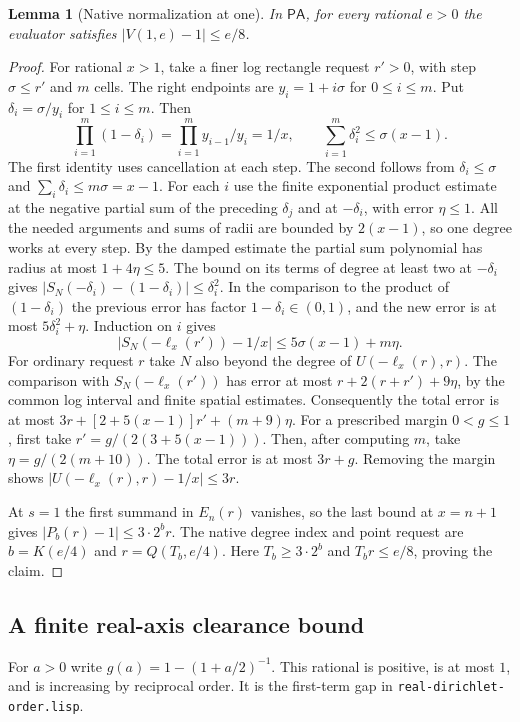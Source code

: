 \documentclass[11pt]{amsart}
\newtheorem{lemma}[theorem]{Lemma}
\theoremstyle{definition}
\theoremstyle{remark}
\numberwithin{equation}{section}
\newcommand{\PA}{\mathsf{PA}}
\newcommand{\code}[1]{\nolinkurl{#1}}
\begin{document}
\begin{lemma}[Native normalization at one]\label{lem:native-at-one}
In $\PA$, for every rational $e>0$ the evaluator satisfies
$|V(1,e)-1|\le e/8$.
\end{lemma}
\begin{proof}
For rational $x>1$, take a finer log rectangle request
$r'>0$, with step $\sigma\le r'$ and $m$ cells. The right
endpoints are $y_i=1+i\sigma$ for $0\le i\le m$.
Put $\delta_i=\sigma/y_i$ for $1\le i\le m$. Then
\[
 \prod_{i=1}^m(1-\delta_i)=\prod_{i=1}^m y_{i-1}/y_i=1/x,
 \qquad
 \sum_{i=1}^m \delta_i^2\le\sigma(x-1).
\]
The first identity uses cancellation at each step. The
second follows from $\delta_i\le\sigma$ and
$\sum_i\delta_i\le m\sigma=x-1$.
For each $i$ use the finite exponential product estimate
at the negative partial sum of the preceding $\delta_j$
and at $-\delta_i$, with error $\eta\le1$. All the needed
arguments and sums of radii are bounded by $2(x-1)$, so
one degree works at every step. By the damped estimate
the partial sum polynomial has radius at most $1+4\eta\le5$.
The bound on its terms of degree at least two at
$-\delta_i$ gives $|S_N(-\delta_i)-(1-\delta_i)|\le\delta_i^2$.
In the comparison to the product of $(1-\delta_i)$ the
previous error has factor $1-\delta_i\in(0,1)$, and the new
error is at most $5\delta_i^2+\eta$. Induction on $i$ gives
\[
 |S_N(-\ell_x(r'))-1/x|\le5\sigma(x-1)+m\eta.
\]
For ordinary request $r$ take $N$ also beyond the degree
of $U(-\ell_x(r),r)$. The comparison with
$S_N(-\ell_x(r'))$ has error at most $r+2(r+r')+9\eta$,
by the common log interval and finite spatial estimates.
Consequently the total error is at most
$3r+[2+5(x-1)]r'+(m+9)\eta$. For a prescribed margin
$0<g\le1$, first take $r'=g/(2(3+5(x-1)))$. Then, after
computing $m$, take $\eta=g/(2(m+10))$.
The total error is at most $3r+g$. Removing the margin
shows $|U(-\ell_x(r),r)-1/x|\le3r$.

At $s=1$ the first summand in $E_n(r)$ vanishes, so the
last bound at $x=n+1$ gives $|P_b(r)-1|\le3\cdot 2^b r$.
The native degree index and point request are
$b=K(e/4)$ and $r=Q(T_b,e/4)$. Here $T_b\ge3\cdot2^b$
and $T_b r\le e/8$, proving the claim.
\end{proof}

\subsection{A finite real-axis clearance bound}
\label{sec:real-axis}

For $a>0$ write $g(a)=1-(1+a/2)^{-1}$. This rational is
positive, is at most $1$, and is increasing by reciprocal
order. It is the first-term gap in \code{real-dirichlet-order.lisp}.
\end{document}

